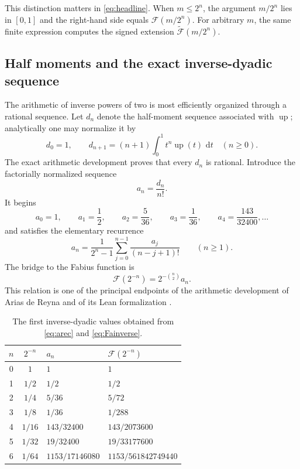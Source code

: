 \documentclass[11pt,oneside]{article}
\theoremstyle{definition}
\theoremstyle{remark}
\newcommand{\F}{\mathcal F}
\newcommand{\G}{\widetilde{\mathcal F}}
\newcommand{\upfun}{\operatorname{up}}
\newcommand{\dd}{\,\mathrm d}
\begin{document}
This distinction matters in \eqref{eq:headline}.  When $m\le2^n$, the argument $m/2^n$ lies in $[0,1]$ and the right-hand side equals $\F(m/2^n)$.  For arbitrary $m$, the same finite expression computes the signed extension $\G(m/2^n)$.

\subsection{Half moments and the exact inverse-dyadic sequence}

The arithmetic of inverse powers of two is most efficiently organized through a rational sequence.  Let $d_n$ denote the half-moment sequence associated with $\upfun$; analytically one may normalize it by
\begin{equation}\label{eq:halfmoments}
 d_0=1,
 \qquad
 d_{n+1}=(n+1)\int_0^1 t^n\upfun(t)\,\dd t
 \quad(n\ge0).
\end{equation}
The exact arithmetic development proves that every $d_n$ is rational.  Introduce the factorially normalized sequence
\begin{equation}\label{eq:an}
  a_n=\frac{d_n}{n!}.
\end{equation}
It begins
\[
 a_0=1,\qquad a_1=\frac12,\qquad
 a_2=\frac5{36},\qquad a_3=\frac1{36},\qquad
 a_4=\frac{143}{32400},\ldots
\]
and satisfies the elementary recurrence
\begin{equation}\label{eq:arec}
  a_n=\frac{1}{2^n-1}
  \sum_{j=0}^{n-1}\frac{a_j}{(n-j+1)!}
  \qquad(n\ge1).
\end{equation}
The bridge to the Fabius function is
\begin{equation}\label{eq:Fainverse}
 \boxed{\F(2^{-n})=2^{-\binom n2}a_n.}
\end{equation}
This relation is one of the principal endpoints of the arithmetic development of Arias de Reyna and of its Lean formalization \cite{AriasArithmetic,ProveIt}.

\begin{table}[H]
\centering
\caption{The first inverse-dyadic values obtained from \eqref{eq:arec} and \eqref{eq:Fainverse}.}
\label{tab:firstvalues}
\begin{tabular}{@{}ccll@{}}
\toprule
$n$ & $2^{-n}$ & $a_n$ & $\F(2^{-n})$\\
\midrule
0 & $1$      & $1$                    & $1$\\
1 & $1/2$    & $1/2$                  & $1/2$\\
2 & $1/4$    & $5/36$                 & $5/72$\\
3 & $1/8$    & $1/36$                 & $1/288$\\
4 & $1/16$   & $143/32400$            & $143/2073600$\\
5 & $1/32$   & $19/32400$             & $19/33177600$\\
6 & $1/64$   & $1153/17146080$        & $1153/561842749440$\\
\bottomrule
\end{tabular}
\end{table}
\end{document}
